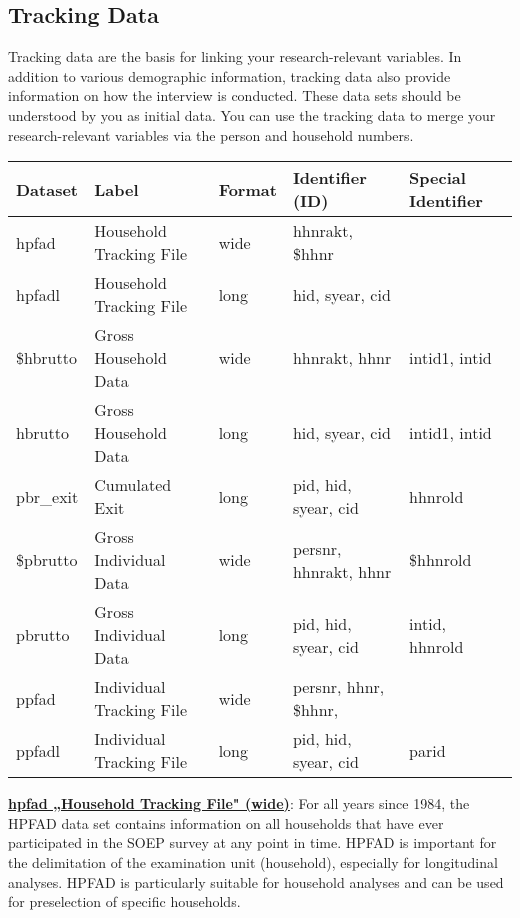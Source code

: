 \documentclass[letterpaper,10pt,openany,onesideH,english]{sphinxmanual}
\begin{document}
\subsection{Tracking Data}
\label{\detokenize{Principles of Data Structure/index:tracking-data}}\label{\detokenize{Principles of Data Structure/index:tracking}}
Tracking data are the basis for linking your research-relevant variables. In addition to various demographic information, tracking data also provide information on how the interview is conducted. These data sets should be understood by you as initial data. You can use the tracking data to merge your research-relevant variables via the person and household numbers.


\begin{savenotes}\sphinxattablestart
\centering
\begin{tabulary}{\linewidth}[t]{|T|T|T|T|T|}
\hline
\sphinxstyletheadfamily 
Dataset
&\sphinxstyletheadfamily 
Label
&\sphinxstyletheadfamily 
Format
&\sphinxstyletheadfamily 
Identifier (ID)
&\sphinxstyletheadfamily 
Special Identifier
\\
\hline
hpfad
&
Household Tracking File
&
wide
&
hhnrakt, \$hhnr
&\\
\hline
hpfadl
&
Household Tracking File
&
long
&
hid, syear, cid
&\\
\hline
\$hbrutto
&
Gross Household Data
&
wide
&
hhnrakt, hhnr
&
intid1, intid
\\
\hline
hbrutto
&
Gross Household Data
&
long
&
hid, syear, cid
&
intid1, intid
\\
\hline
pbr\_exit
&
Cumulated Exit
&
long
&
pid, hid, syear, cid
&
hhnrold
\\
\hline
\$pbrutto
&
Gross Individual Data
&
wide
&
persnr, hhnrakt, hhnr
&
\$hhnrold
\\
\hline
pbrutto
&
Gross Individual Data
&
long
&
pid, hid,  syear,  cid
&
intid, hhnrold
\\
\hline
ppfad
&
Individual Tracking File
&
wide
&
persnr, hhnr, \$hhnr,
&\\
\hline
ppfadl
&
Individual Tracking File
&
long
&
pid, hid, syear, cid
&
parid
\\
\hline
\end{tabulary}
\par
\sphinxattableend\end{savenotes}

 \href{https://paneldata.org/soep-core/data/hpfad}{\textbf{hpfad „Household Tracking File" (wide)}}: For all years since 1984, the HPFAD data set contains information on all households that have ever participated in the SOEP survey at any point in time. HPFAD is important for the delimitation of the examination unit (household), especially for longitudinal analyses. HPFAD is particularly suitable for household analyses and can be used for preselection of specific households.
\end{document}
